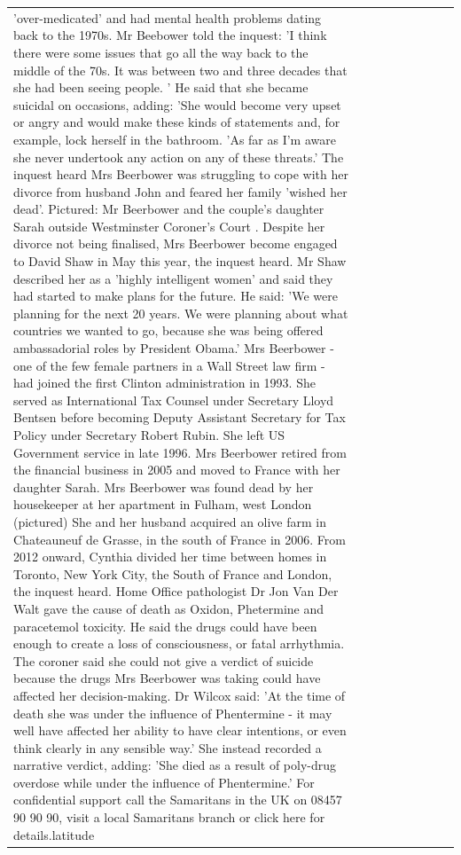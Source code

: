 \begin{table}[H]
\begin{tabular}{lllrlllll}
'over-medicated' and had mental health problems dating back to the 1970s. Mr Beebower told the inquest: 'I think there were some issues that go all the way back to the middle of the 70s. It was between two and three decades that she had been seeing people. ' He said that she became suicidal on occasions, adding: 'She would become very upset or angry and would make these kinds of statements and, for example, lock herself in the bathroom. 'As far as I'm aware she never undertook any action on any of these threats.' The inquest heard Mrs Beerbower was struggling to cope with her divorce from husband John and feared her family 'wished her dead'. Pictured: Mr Beerbower and the couple's daughter Sarah outside Westminster Coroner's Court . Despite her divorce not being finalised, Mrs Beerbower become engaged to David Shaw in May this year, the inquest heard. Mr Shaw described her as a 'highly intelligent women' and said they had started to make plans for the future. He said: 'We were planning for the next 20 years. We were planning about what countries we wanted to go, because she was being offered ambassadorial roles by President Obama.' Mrs Beerbower - one of the few female partners in a Wall Street law firm - had joined the first Clinton administration in 1993. She served as International Tax Counsel under Secretary Lloyd Bentsen before becoming Deputy Assistant Secretary for Tax Policy under Secretary Robert Rubin. She left US Government service in late 1996. Mrs Beerbower retired from the financial business in 2005 and moved to France with her daughter Sarah. Mrs Beerbower was found dead by her housekeeper at her apartment in Fulham, west London (pictured) She and her husband acquired an olive farm in Chateauneuf de Grasse, in the south of France in 2006. From 2012 onward, Cynthia divided her time between homes in Toronto, New York City, the South of France and London, the inquest heard. Home Office pathologist Dr Jon Van Der Walt gave the cause of death as Oxidon, Phetermine and paracetemol toxicity. He said the drugs could have been enough to create a loss of consciousness, or fatal arrhythmia. The coroner said she could not give a verdict of suicide because the drugs Mrs Beerbower was taking could have affected her decision-making. Dr Wilcox said: 'At the time of death she was under the influence of Phentermine - it may well have affected her ability to have clear intentions, or even think clearly in any sensible way.' She instead recorded a narrative verdict, adding: 'She died as a result of poly-drug overdose while under the influence of Phentermine.' For confidential support call the Samaritans in the UK on 08457 90 90 90, visit a local Samaritans branch or click here for details.latitude \\

\end{tabular}
\end{table}
